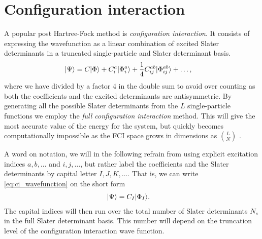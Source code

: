\chapter{Configuration interaction}
     A popular post Hartree-Fock method is \textit{configuration interaction}.
     It consists of expressing the wavefunction as a linear combination of
     excited Slater determinants in a truncated single-particle and Slater
     determinant basis.
     \begin{align}
         | \Psi \rangle
         &= C| \Phi \rangle
         + C^a_i| \Phi^{a}_{i} \rangle
         + \frac{1}{4}C^{ab}_{ij}| \Phi^{ab}_{ij} \rangle
         + \dots,
         \label{eq:ci_wavefunction}
     \end{align}
     where we have divided by a factor $4$ in the double sum to avoid over
     counting as both the coefficients and the excited determinants are
     antisymmetric. By generating all the possible Slater determinants from the
     $L$ single-particle functions we employ the \textit{full configuration
     interaction} method. This will give the most accurate value of the energy
     for the system, but quickly becomes computationally impossible as the FCI
     space grows in dimensions as $\binom{L}{N}$ \cite{kvaal2017notes}.

     A word on notation, we will in the following refrain from using explicit
     excitation indices $a, b, \dots$ and $i, j, \dots$, but rather label the
     coefficients and the Slater determinants by capital letter $I, J, K,
     \dots$.
     That is, we can write \autoref{eq:ci_wavefunction} on the short form
     \begin{align}
         | \Psi \rangle
         &= C_{I}| \Phi_I \rangle.
     \end{align}
     The capital indices will then run over the total number of Slater
     determinants $N_s$ in the full Slater determinant basis.
     This number will depend on the truncation level of the configuration
     interaction wave function.

